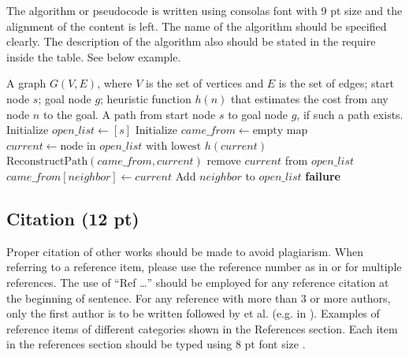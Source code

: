 \documentclass[10pt,a4paper]{article}
\begin{document}
The algorithm or pseudocode is written using consolas font with 9 pt size and the alignment of the content is left. The name of the algorithm should be specified clearly. The description of the algorithm also should be stated in the require inside the table. See below example.

\begin{algorithm}[htbp]
\caption{Greedy search algorithm (10 pt)}
\label{alg:greedy}
\begin{algorithmic}[1]
\Require A graph $G(V,E)$, where $V$ is the set of vertices and $E$ is the set of edges; start node $s$; goal node $g$; heuristic function $h(n)$ that estimates the cost from any node $n$ to the goal.
\Ensure A path from start node $s$ to goal node $g$, if such a path exists.
\State Initialize $open\_list \gets [s]$
\State Initialize $came\_from \gets \text{empty map}$
    \State $current \gets \text{node in } open\_list \text{ with lowest } h(current)$
        \State \Return $\text{ReconstructPath}(came\_from, current)$
    \EndIf
    \State remove $current$ from $open\_list$
            \State $came\_from[neighbor] \gets current$
            \State Add $neighbor$ to $open\_list$
        \EndIf
    \EndFor
\EndWhile
\State \Return \textbf{failure}
\end{algorithmic}
\end{algorithm}

\subsection{Citation (12 pt)}

Proper citation of other works should be made to avoid plagiarism. When referring to a reference item, please use the reference number as in \cite{nallaperuma2019online} or \cite{schulz2019advanced} for multiple references. The use of ``Ref \cite{shang2019data} \dots'' should be employed for any reference citation at the beginning of sentence. For any reference with more than 3 or more authors, only the first author is to be written followed by et al. (e.g. in \cite{yu2019clinical}). Examples of reference items of different categories shown in the References section. Each item in the references section should be typed using 8 pt font size \cite{huang2019queuing, xu2019internet, aqib2019smarter, leonelli2020data, stylos2019big, song2017tensor}.
\end{document}

